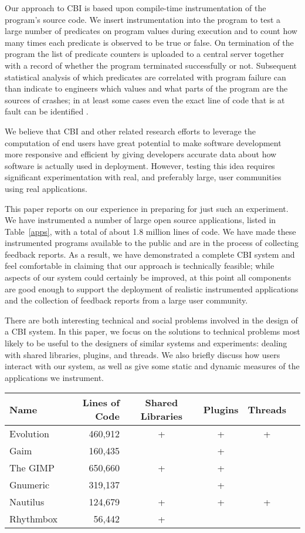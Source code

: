 \documentclass[times,10pt,twocolumn]{article}
\begin{document}
Our approach to CBI is based upon compile-time instrumentation of the
program's source code.  We insert instrumentation into the program to
test a large number of predicates on program values during
execution and to count how many times each predicate is observed to be
true or false.  On termination of the program the list of predicate
counters is uploaded to a central server together with a record of
whether the program terminated successfully or not.  Subsequent
statistical analysis of which predicates are correlated with program
failure can than indicate to engineers which values and what parts of
the program are the sources of crashes; in at least some cases even
the exact line of code that is at fault can be identified \cite{Liblit:2003:SUEBI,Zheng:2003:SDSP,PLDI`03*141}.

We believe that CBI and other related research efforts to leverage the 
computation of end users have great potential to make software development
more responsive and efficient by giving developers accurate data about
how software is actually used in deployment.  However, testing this idea
requires significant experimentation with real, and preferably large,
 user communities using real applications.  

This paper reports on our experience in preparing for just such an
experiment.  We have instrumented a number of large open source
applications, listed in Table~\ref{apps}, with a total of about 1.8
million lines of code. We have made these instrumented programs
available to the public and are in the process of collecting feedback
reports.  As a result, we have demonstrated a complete CBI system and
feel comfortable in claiming that our approach is technically
feasible; while aspects of our system could certainly be improved, at
this point all components are good enough to support the deployment of
realistic instrumented applications and the collection of feedback
reports from a large user community.

There are both interesting technical and social problems involved in
the design of a CBI system.  In this paper, we focus on the solutions
to technical problems most likely to be useful to the designers of
similar systems and experiments: dealing with shared libraries,
plugins, and threads.  We also briefly discuss how users interact with
our system, as well as give some static and dynamic measures of the
applications we instrument.

\begin{table*}
  \centering
  \begin{tabular}{lrcccc}
    Name & Lines of Code & Shared Libraries & Plugins & Threads \\\hline
    Evolution & 460,912 & + & + & + \\
    Gaim & 160,435 & & + & \\
    The GIMP & 650,660 & + & + & \\
    Gnumeric & 319,137 & & + & \\
    Nautilus & 124,679 & + & + & + \\
    Rhythmbox & 56,442 & + & &
  \end{tabular}
  \caption{Instrumented applications}
  \label{apps}
\end{table*}
\end{document}

